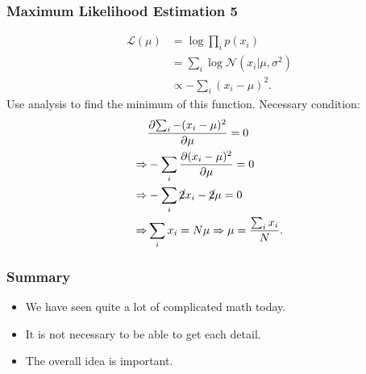 \documentclass[USenglish,pdftex,compress,10pt,svgnamesi,handout]{beamer}
\newcommand{\eq}[1]{\begin{align*}#1\end{align*}}
\newcommand{\pd}[2]{\frac{\partial{#1}}{\partial{#2}}}
\begin{document}
\begin{frame}
\frametitle{Maximum Likelihood Estimation 5}
\eq{
    \mathcal{L}(\mu)
        &= \log \prod_i p(x_i) \\
        &= \sum_i \log \mathcal{N}(x_i|\mu, \sigma^2) \\
        &\propto -\sum_i (x_i - \mu)^2.
}
\pause
Use analysis to find the minimum of this function. Necessary condition:
\eq{
    & \pd{\sum_i -(x_i - \mu)^2}{\mu} = 0 \\
    \Rightarrow& -\sum_i \pd{(x_i - \mu)^2}{\mu} = 0 \\
    \Rightarrow& -\sum_i \cancel{2}x_i - \cancel{2}\mu = 0 \\
    \Rightarrow& \sum_i x_i = N\mu \Rightarrow \mu = \frac{\sum_i x_i}{N}.
}
\end{frame}


\begin{frame}
\frametitle{Summary}
\begin{itemize}
    \item We have seen quite a lot of complicated math today.
    \item It is not necessary to be able to get each detail.
    \item The overall idea is important.
\end{itemize}
\end{frame}


\end{document}
